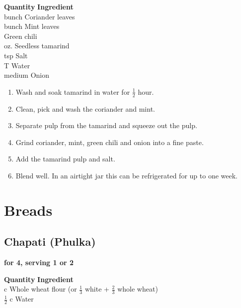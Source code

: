 \begin{tabbing}
\hspace{1.0cm}  \={\bf Quantity}   \hspace{3.0cm} \={\bf Ingredient}\\
 bunch \> Coriander leaves\\
 bunch \> Mint leaves\\
 \> Green chili\\
 oz. \> Seedless tamarind\\
 tsp \> Salt\\
 T \>  Water\\
 medium \> Onion\\
\end{tabbing}

\begin{enumerate}
\item  Wash and soak tamarind in water for $\frac{1}{2}$ hour.
\item Clean, pick and wash the coriander and mint.
\item Separate pulp from the tamarind and squeeze out the pulp.
\item Grind coriander, mint, green chili and onion into a fine paste.
\item Add the tamarind pulp and salt.
\item Blend well.
In an airtight jar this can be refrigerated for up to one week.
\end{enumerate}

\chapter{Breads}

\section{Chapati (Phulka)}
{\bf for 4, serving 1 or 2}

\begin{tabbing}
\hspace{1.0cm}  \={\bf Quantity}   \hspace{3.0cm} \={\bf Ingredient}\\
 c \> Whole wheat flour (or $\frac{1}{3}$ white + $\frac{2}{3}$ whole wheat)\\
\> $\frac{1}{2}$ c \> Water\\
\end{tabbing}

